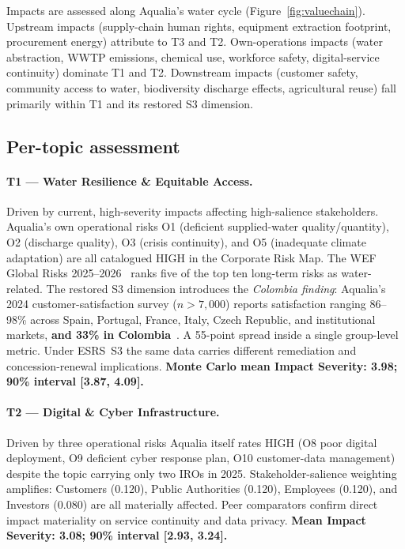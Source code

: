 \documentclass[11pt, a4paper]{article}
\newcommand{\sig}[1]{\textbf{#1}}
\begin{document}
Impacts are assessed along Aqualia's water cycle (Figure~\ref{fig:valuechain}). Upstream impacts (supply-chain human rights, equipment extraction footprint, procurement energy) attribute to T3 and T2. Own-operations impacts (water abstraction, WWTP emissions, chemical use, workforce safety, digital-service continuity) dominate T1 and T2. Downstream impacts (customer safety, community access to water, biodiversity discharge effects, agricultural reuse) fall primarily within T1 and its restored S3 dimension.

\subsection{Per-topic assessment}

\paragraph{T1 --- Water Resilience \& Equitable Access.}
Driven by current, high-severity impacts affecting high-salience stakeholders. Aqualia's own operational risks O1 (deficient supplied-water quality/quantity), O2 (discharge quality), O3 (crisis continuity), and O5 (inadequate climate adaptation) are all catalogued HIGH in the Corporate Risk Map. The WEF Global Risks 2025--2026~\cite{wef2025} ranks five of the top ten long-term risks as water-related. The restored S3 dimension introduces the \emph{Colombia finding}: Aqualia's 2024 customer-satisfaction survey ($n > 7{,}000$) reports satisfaction ranging 86--98\% across Spain, Portugal, France, Italy, Czech Republic, and institutional markets, \sig{and 33\% in Colombia}~\cite{aqualiaSR2024}. A 55-point spread inside a single group-level metric. Under ESRS~S3 the same data carries different remediation and concession-renewal implications. \sig{Monte Carlo mean Impact Severity: 3.98; 90\% interval [3.87, 4.09].}

\paragraph{T2 --- Digital \& Cyber Infrastructure.}
Driven by three operational risks Aqualia itself rates HIGH (O8 poor digital deployment, O9 deficient cyber response plan, O10 customer-data management) despite the topic carrying only two IROs in 2025. Stakeholder-salience weighting amplifies: Customers (0.120), Public Authorities (0.120), Employees (0.120), and Investors (0.080) are all materially affected. Peer comparators confirm direct impact materiality on service continuity and data privacy. \sig{Mean Impact Severity: 3.08; 90\% interval [2.93, 3.24].}
\end{document}

